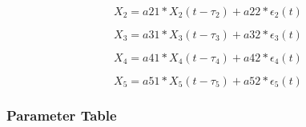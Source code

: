 \begin{equation}
X_2= a21*X_2(t- \tau_2) + a22*\epsilon_2(t)
\end{equation}

\begin{equation}
X_3= a31*X_3(t- \tau_3) + a32*\epsilon_3(t)
\end{equation}

\begin{equation}
X_4= a41*X_4(t- \tau_4) + a42*\epsilon_4(t)
\end{equation}

\begin{equation}
X_5= a51*X_5(t- \tau_5) + a52*\epsilon_5(t)
\end{equation}

\subsubsection{Parameter Table}

